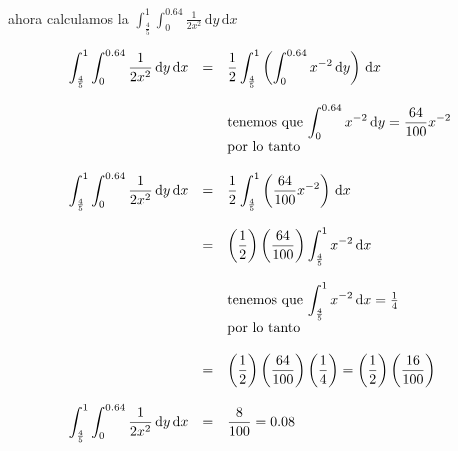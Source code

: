 \documentclass[12pt]{article}
\begin{document}
    \hspace{1cm}

    \begin{flushleft}
        ahora calculamos la $ \displaystyle \int_{\frac{4}{5}}^{1} \int_{0}^{0.64} \frac{1}{2x^2} \,\mathrm{d}y \,\mathrm{d}x $
    \end{flushleft}

    \begin{equation*}
        \begin{array}{rcl}
            \displaystyle \int_{\frac{4}{5}}^{1} \int_{0}^{0.64} \frac{1}{2x^2} \,\mathrm{d}y \,\mathrm{d}x & = & \displaystyle  \frac{1}{2} \int_{\frac{4}{5}}^{1} \left(\int_{0}^{0.64} x^{-2} \,\mathrm{d}y \right) \,\mathrm{d}x 
            \\
            \\
            && \mbox{tenemos que $ \displaystyle \int_{0}^{0.64} x^{-2} \,\mathrm{d}y = \frac{64}{100}x^{-2} $}
            \\
            && \mbox{por lo tanto} 
            \\
            \\
            \displaystyle \int_{\frac{4}{5}}^{1} \int_{0}^{0.64} \frac{1}{2x^2} \,\mathrm{d}y \,\mathrm{d}x & = & \displaystyle  \frac{1}{2}\displaystyle \int_{\frac{4}{5}}^{1} \left(\frac{64}{100} x^{-2}\right) \,\mathrm{d}x
            \\
            \\
            & = & \displaystyle \left(\frac{1}{2}\right) \left(\frac{64}{100}\right) \int_{\frac{4}{5}}^{1} x^{-2} \,\mathrm{d}x 
            \\
            \\
            && \mbox{tenemos que $ \displaystyle \int_{\frac{4}{5}}^{1} x^{-2} \,\mathrm{d}x$} = \frac{1}{4}
            \\
            && \mbox{por lo tanto } 
            \\
            \\
            & = & \displaystyle \left(\frac{1}{2}\right) \left(\frac{64}{100}\right) \left(\frac{1}{4}\right) = \left(\frac{1}{2}\right) \left(\frac{16}{100}\right)
            \\
            \\
            \displaystyle \int_{\frac{4}{5}}^{1} \int_{0}^{0.64} \frac{1}{2x^2} \,\mathrm{d}y \,\mathrm{d}x & = & \displaystyle \frac{8}{100} = 0.08
        \end{array}
    \end{equation*}
\end{document}
